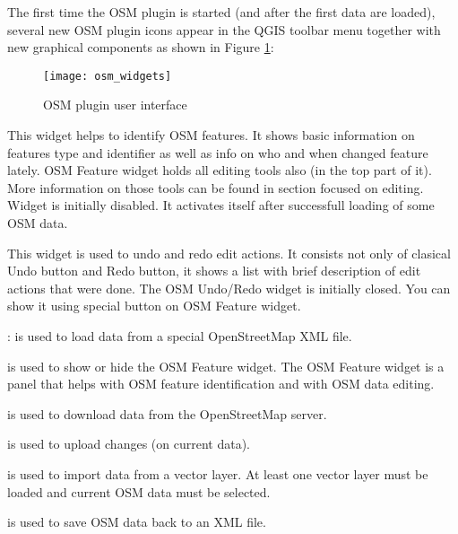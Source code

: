 The first time the OSM plugin is started (and after the first data are 
loaded), several new OSM plugin icons appear in the QGIS toolbar menu 
together with new graphical components as shown in Figure 
\ref{fig:osmwidget}:

\begin{figure}[ht]
   \begin{center}
   \caption{OSM plugin user interface \nixcaption}\label{fig:osmwidget}\smallskip
   \texttt{[image: osm\_widgets]}
\end{center}
\end{figure}


This widget helps to identify OSM features. It
shows basic information on features type and identifier as well as info on
who and when changed feature lately. OSM Feature widget holds all editing
tools also (in the top part of it). More information on those tools can be
found in section focused on editing. Widget is initially disabled. It
activates itself after successfull loading of some OSM data.


This widget is used to undo and redo edit actions. It consists not only 
of clasical Undo button and Redo button, it shows a list with brief 
description of edit actions that were done. The OSM Undo/Redo widget
is initially closed. You can show it using special button on OSM Feature
widget.


\begin{description}
\item {}: is used to load data from a 
special OpenStreetMap XML file.
\item {} is 
used to show or hide the OSM Feature widget. The OSM Feature widget is a 
panel that helps with OSM feature identification and with OSM data editing.
\item {} is used to download data 
from the OpenStreetMap server.
\item {} is used to upload changes 
(on current data). 
\item {} is used to import 
data from a vector layer. At least one vector layer must be loaded and 
current OSM data must be selected.
\item {} is used to save OSM data 
back to an XML file.
\end{description}

